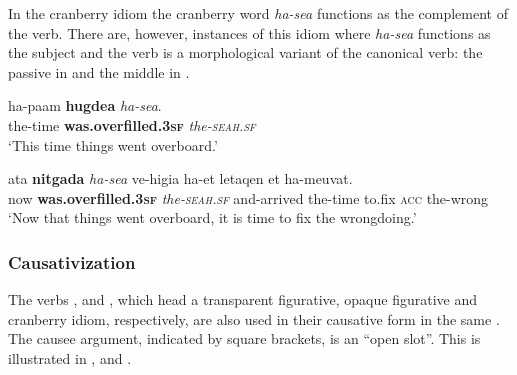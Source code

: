 \documentclass[output=paper]{langsci/langscibook}
\begin{document}

In the cranberry idiom  the cranberry word \textit{ha-se{\alef}a} functions as the complement of the verb.  There are, however, instances of this idiom where \textit{ha-se{\alef}a} functions as the subject and the verb is a morphological variant of the canonical verb: the passive  in  and the middle  in .

    \ea\label{she:sea-passive}
         \gll ha-pa{\ayin}am \textbf{hugde{\shinB}a} \textit{ha-se{\alef}a}.\\
             the-time \textbf{was.overfilled.\textsc{3sf}} \textit{the-\textsc{seah}.\textsc{sf}}\\
         \glt `This time things went overboard.'
    \z

	\ea\label{she:sea-arg-rev}
    	\gll {\ayin}ata \textbf{nitgad{\shinB}a} \textit{ha-se{\alef}a} ve-higi{\ayin}a ha-{\ayin}et letaqen {\alef}et ha-me{\ayin}uvat.\\
    	   now \textbf{was.overfilled.\textsc{3sf}} \textit{the-\textsc{seah}.\textsc{sf}} and-arrived the-time to.fix \textsc{acc} the-wrong\\
    	\glt `Now that things went overboard, it is time to fix the wrongdoing.'
	\z

\subsubsection{Causativization}
\label{she:sec:causativization}

The verbs ,  and  , which head a transparent figurative, opaque figurative and cranberry idiom, respectively, are also used in their causative form in the same . The causee argument, indicated by square brackets, is an ``open slot''. This is illustrated in ,  and .
\end{document}
